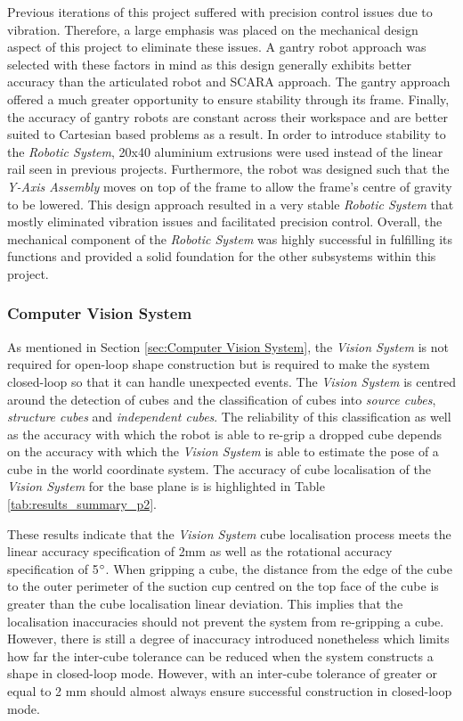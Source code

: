 Previous iterations of this project suffered with precision control issues due to vibration. Therefore, a large emphasis was placed on the mechanical design aspect of this project to eliminate these issues. A gantry robot approach was selected with these factors in mind as this design generally exhibits better accuracy than the articulated robot and SCARA approach. The gantry approach offered a much greater opportunity to ensure stability through its frame. Finally, the accuracy of gantry robots are constant across their workspace and are better suited to Cartesian based problems as a result. In order to introduce stability to the \textit{Robotic System}, 20x40 aluminium extrusions were used instead of the linear rail seen in previous projects. Furthermore, the robot was designed such that the \textit{Y-Axis Assembly} moves on top of the frame to allow the frame's centre of gravity to be lowered. This design approach resulted in a very stable \textit{Robotic System} that mostly eliminated vibration issues and facilitated precision control. Overall, the mechanical component of the \textit{Robotic System} was highly successful in fulfilling its functions and provided a solid foundation for the other subsystems within this project.

\subsubsection{Computer Vision System} \label{sec5:Computer Vision System}

As mentioned in Section \ref{sec:Computer Vision System}, the \textit{Vision System} is not required for open-loop shape construction but is required to make the system closed-loop so that it can handle unexpected events. The \textit{Vision System} is centred around the detection of cubes and the classification of cubes into \textit{source cubes}, \textit{structure cubes} and \textit{independent cubes}. The reliability of this classification as well as the accuracy with which the robot is able to re-grip a dropped cube depends on the accuracy with which the \textit{Vision System} is able to estimate the pose of a cube in the world coordinate system. The accuracy of cube localisation of the \textit{Vision System} for the base plane is is highlighted in Table \ref{tab:results_summary_p2}.

These results indicate that the \textit{Vision System} cube localisation process meets the linear accuracy specification of 2mm as well as the rotational accuracy specification of 5$^{\circ}$. When gripping a cube, the distance from the edge of the cube to the outer perimeter of the suction cup centred on the top face of the cube is greater than the cube localisation linear deviation. This implies that the localisation inaccuracies should not prevent the system from re-gripping a cube. However, there is still a degree of inaccuracy introduced nonetheless which limits how far the inter-cube tolerance can be reduced when the system constructs a shape in closed-loop mode. However, with an inter-cube tolerance of greater or equal to 2 mm should almost always ensure successful construction in closed-loop mode.

